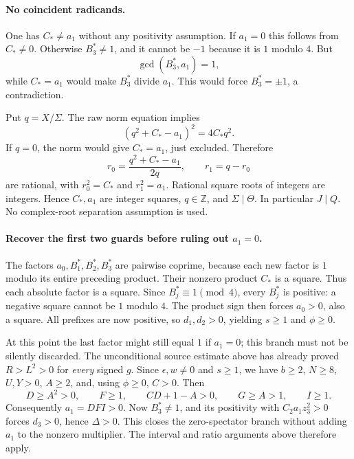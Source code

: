 \paragraph{No coincident radicands.}
One has $C_*\ne a_1$ without any positivity assumption. If $a_1=0$ this
follows from $C_*\ne0$. Otherwise $B_3^*\ne1$, and it cannot be $-1$
because it is $1$ modulo $4$. But
\[
 \gcd(B_3^*,a_1)=1,
\]
while $C_*=a_1$ would make $B_3^*$ divide $a_1$. This would force
$B_3^*=\pm1$, a contradiction.

Put $q=X/\Sigma$. The raw norm equation implies
\[
 (q^2+C_*-a_1)^2=4C_*q^2.
\]
If $q=0$, the norm would give $C_*=a_1$, just excluded. Therefore
\[
 r_0=\frac{q^2+C_*-a_1}{2q},\qquad r_1=q-r_0
\]
are rational, with $r_0^2=C_*$ and $r_1^2=a_1$. Rational square roots of
integers are integers. Hence $C_*,a_1$ are integer squares,
$q\in\mathbb Z$, and $\Sigma\mid\Theta$. In particular $J\mid Q$.
No complex-root separation assumption is used.

\paragraph{Recover the first two guards before ruling out $a_1=0$.}
The factors $a_0,B_1^*,B_2^*,B_3^*$ are pairwise coprime, because each
new factor is $1$ modulo its entire preceding product. Their nonzero product
$C_*$ is a square. Thus each absolute factor is a square. Since
$B_j^*\equiv1\pmod4$, every $B_j^*$ is positive: a negative square cannot
be $1$ modulo $4$. The product sign then forces $a_0>0$, also a square.
All prefixes are now positive, so $d_1,d_2>0$, yielding $s\ge1$ and
$\phi\ge0$.

At this point the last factor might still equal $1$ if $a_1=0$; this branch
must not be silently discarded. The unconditional source estimate above
has already proved $R>L^2>0$ for \emph{every} signed $g$. Since
$\epsilon,w\ne0$ and $s\ge1$, we have $b\ge2$, $N\ge8$, $U,Y>0$,
$A\ge2$, and, using $\phi\ge0$, $C>0$. Then
\[
 D\ge A^2>0,\qquad F\ge1,\qquad
 CD+1-A>0,\qquad G\ge A>1,\qquad I\ge1.
\]
Consequently $a_1=DFI>0$. Now $B_3^*\ne1$, and its positivity with
$C_2a_1z_3^2>0$ forces $d_3>0$, hence $\Delta>0$. This closes the
zero-spectator branch without adding $a_1$ to the nonzero multiplier.
The interval and ratio arguments above therefore apply.

